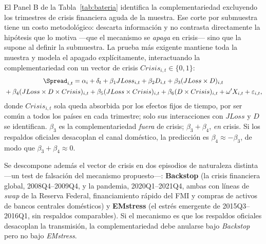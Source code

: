 El Panel B de la Tabla~\ref{tab:bateria} identifica la complementariedad excluyendo los trimestres de crisis financiera aguda de la muestra. Ese corte por submuestra tiene un costo metodológico: descarta información y no contrasta directamente la hipótesis que lo motiva —que el mecanismo se \emph{apaga} en crisis— sino que la supone al definir la submuestra. La prueba más exigente mantiene toda la muestra y modela el apagado explícitamente, interactuando la complementariedad con un vector de crisis $Crisis_{i,t}\in\{0,1\}$:
\begin{multline}
\Spread_{i,t} = \alpha_i + \delta_t + \beta_1 JLoss_{i,t} + \beta_2 D_{i,t} + \beta_3(JLoss\times D)_{i,t}\\
{}+ \beta_4(JLoss\times D\times Crisis)_{i,t} + \beta_5(JLoss\times Crisis)_{i,t} + \beta_6(D\times Crisis)_{i,t} + \omega'X_{i,t} + \varepsilon_{i,t},
\label{eq:crisisint}
\end{multline}
donde $Crisis_{i,t}$ sola queda absorbida por los efectos fijos de tiempo, por ser común a todos los países en cada trimestre; solo sus interacciones con $JLoss$ y $D$ se identifican. $\beta_3$ es la complementariedad \emph{fuera} de crisis; $\beta_3+\beta_4$, \emph{en} crisis. Si los respaldos oficiales desacoplan el canal doméstico, la predicción es $\beta_4\approx-\beta_3$, de modo que $\beta_3+\beta_4\approx0$.

Se descompone además el vector de crisis en dos episodios de naturaleza distinta —un test de falsación del mecanismo propuesto—: \textbf{Backstop} (la crisis financiera global, 2008Q4--2009Q4, y la pandemia, 2020Q1--2021Q4, ambas con líneas de \textit{swap} de la Reserva Federal, financiamiento rápido del FMI y compras de activos de bancos centrales domésticos) y \textbf{EMstress} (el estrés emergente de 2015Q3--2016Q1, sin respaldos comparables). Si el mecanismo es que los respaldos oficiales desacoplan la transmisión, la complementariedad debe anularse bajo \textit{Backstop} pero no bajo \textit{EMstress}.


